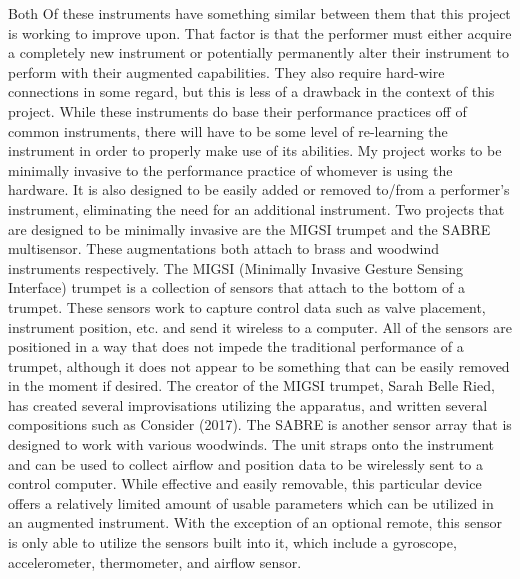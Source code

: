 Both Of these instruments have something similar between them that this project is working to improve upon. That factor is that the performer must either acquire a completely new instrument or potentially permanently alter their instrument to perform with their augmented capabilities. They also require hard-wire connections in some regard, but this is less of a drawback in the context of this project. While these instruments do base their performance practices off of common instruments, there will have to be some level of re-learning the instrument in order to properly make use of its abilities. 
My project works to be minimally invasive to the performance practice of whomever is using the hardware. It is also designed to be easily added or removed to/from a performer’s instrument, eliminating the need for an additional instrument. Two projects that are designed to be minimally invasive are the MIGSI trumpet and the SABRE multisensor. These augmentations both attach to brass and woodwind instruments respectively. 
The MIGSI (Minimally Invasive Gesture Sensing Interface) trumpet is a collection of sensors that attach to the bottom of a trumpet. These sensors work to capture control data such as valve placement, instrument position, etc. and send it wireless to a computer. All of the sensors are positioned in a way that does not impede the traditional performance of a trumpet, although it does not appear to be something that can be easily removed in the moment if desired.
The creator of the MIGSI trumpet, Sarah Belle Ried, has created several improvisations utilizing the apparatus, and written several compositions such as Consider (2017). The SABRE is another sensor array that is designed to work with various woodwinds. The unit straps onto the instrument and can be used to collect airflow and position data to be wirelessly sent to a control computer. While effective and easily removable, this particular device offers a relatively limited amount of usable parameters which can be utilized in an augmented instrument.
With the exception of an optional remote, this sensor is only able to utilize the sensors built into it, which include a gyroscope, accelerometer, thermometer, and airflow sensor.

